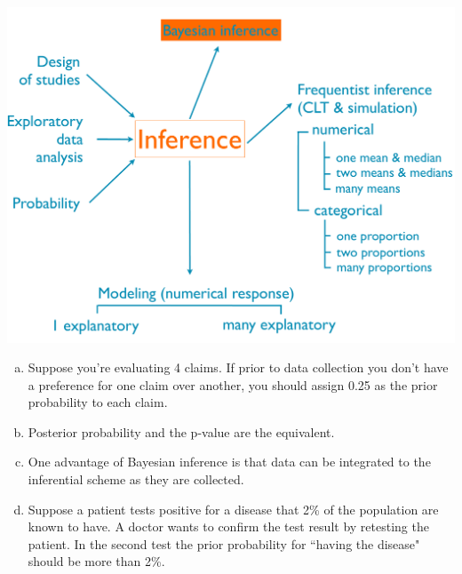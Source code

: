 \documentclass[11pt,containsverbatim,handout,xcolor=xelatex,dvipsnames,table]{beamer}
\newcommand{\solnMult}[1]{#1}
\newcommand{\soln}[1]{}
\begin{document}

\begin{frame}

{
{\scriptsize
{}}}
{
 \includegraphics[width=\textwidth]{figures/map/bayes}
}

\begin{enumerate}[(a)]
\item Suppose you're evaluating 4 claims. If prior to data collection you don't have a preference for one claim over another, you should assign 0.25 as the prior probability to each claim.
\item \solnMult{Posterior probability and the p-value are the equivalent.}
\item One advantage of Bayesian inference is that data can be integrated to the inferential scheme as they are collected.
\item Suppose a patient tests positive for a disease that 2\% of the population are known to have. A doctor wants to confirm the test result by retesting the patient. In the second test the prior probability for ``having the disease" should be more than 2\%.
\end{enumerate}

\pause
\soln{\red{Posterior = P(hypothesis $|$ data), p-value $\approx$ P(data $|$ hypothesis)}}

\end{frame}

\end{document}
